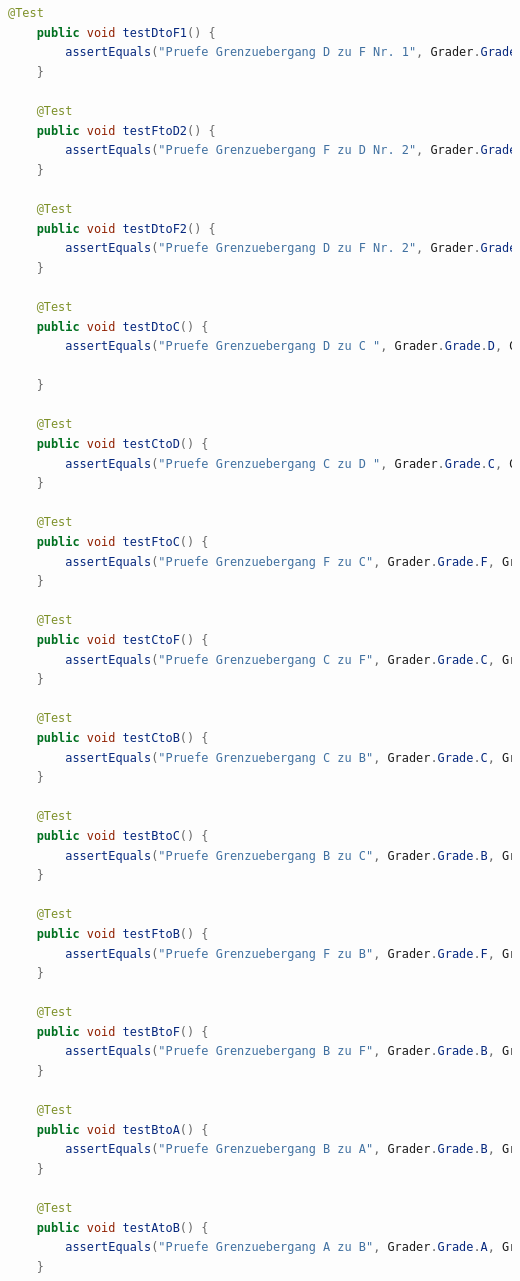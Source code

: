 \begin{parlist}
\begin{lstlisting}[language=java,frame=trBL]
	@Test
	public void testDtoF1() {
		assertEquals("Pruefe Grenzuebergang D zu F Nr. 1", Grader.Grade.D, Grader.grade(30, 21));
	}

	@Test
	public void testFtoD2() {
		assertEquals("Pruefe Grenzuebergang F zu D Nr. 2", Grader.Grade.F, Grader.grade(19, 25));
	}

	@Test
	public void testDtoF2() {
		assertEquals("Pruefe Grenzuebergang D zu F Nr. 2", Grader.Grade.D, Grader.grade(21, 25));
	}

	@Test
	public void testDtoC() {
		assertEquals("Pruefe Grenzuebergang D zu C ", Grader.Grade.D, Grader.grade(30, 30));
		
	}
	
	@Test
	public void testCtoD() {
		assertEquals("Pruefe Grenzuebergang C zu D ", Grader.Grade.C, Grader.grade(31, 31));
	}

	@Test
	public void testFtoC() {
		assertEquals("Pruefe Grenzuebergang F zu C", Grader.Grade.F, Grader.grade(19, 45));
	}
	
	@Test
	public void testCtoF() {
		assertEquals("Pruefe Grenzuebergang C zu F", Grader.Grade.C, Grader.grade(20, 45));
	}

	@Test
	public void testCtoB() {
		assertEquals("Pruefe Grenzuebergang C zu B", Grader.Grade.C, Grader.grade(30, 44));
	}
	
	@Test
	public void testBtoC() {
		assertEquals("Pruefe Grenzuebergang B zu C", Grader.Grade.B, Grader.grade(30, 45));
	}

	@Test
	public void testFtoB() {
		assertEquals("Pruefe Grenzuebergang F zu B", Grader.Grade.F, Grader.grade(19, 55));
	}
	
	@Test
	public void testBtoF() {
		assertEquals("Pruefe Grenzuebergang B zu F", Grader.Grade.B, Grader.grade(20, 55));
	}

	@Test
	public void testBtoA() {
		assertEquals("Pruefe Grenzuebergang B zu A", Grader.Grade.B, Grader.grade(35, 54));
	}
	
	@Test
	public void testAtoB() {
		assertEquals("Pruefe Grenzuebergang A zu B", Grader.Grade.A, Grader.grade(35, 55));
	}

\end{lstlisting}


\end{parlist}
